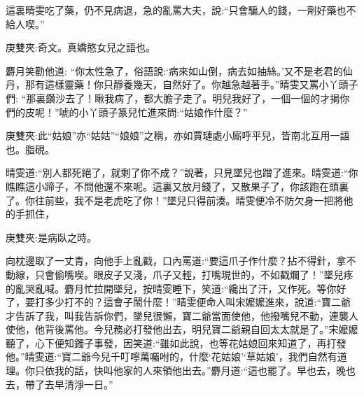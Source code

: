 \begin{parag}
    這裏晴雯吃了藥，仍不見病退，急的亂罵大夫，說:“只會騙人的錢，一劑好藥也不給人喫。”\begin{note}庚雙夾:奇文。真嬌憨女兒之語也。\end{note}麝月笑勸他道: “你太性急了，俗語說:‘病來如山倒，病去如抽絲。’又不是老君的仙丹，那有這樣靈藥！你只靜養幾天，自然好了。你越急越著手。”晴雯又罵小丫頭子們: “那裏鑽沙去了！瞅我病了，都大膽子走了。明兒我好了，一個一個的才揭你們的皮呢！”唬的小丫頭子篆兒忙進來問:“姑娘作什麼？”\begin{note}庚雙夾:此“姑娘”亦“姑姑”“娘娘”之稱，亦如賈璉處小廝呼平兒，皆南北互用一語也。脂硯。\end{note}晴雯道:“別人都死絕了，就剩了你不成？”說著，只見墜兒也蹭了進來。晴雯道:“你瞧瞧這小蹄子，不問他還不來呢。這裏又放月錢了，又散果子了，你該跑在頭裏了。你往前些，我不是老虎吃了你！”墜兒只得前湊。晴雯便冷不防欠身一把將他的手抓住，\begin{note}庚雙夾:是病臥之時。\end{note}向枕邊取了一丈青，向他手上亂戳，口內罵道:“要這爪子作什麼？拈不得針，拿不動線，只會偷嘴喫。眼皮子又淺，爪子又輕，打嘴現世的，不如戳爛了！”墜兒疼的亂哭亂喊。麝月忙拉開墜兒，按晴雯睡下，笑道:“纔出了汗，又作死。等你好了，要打多少打不的？這會子鬧什麼！”晴雯便命人叫宋嬤嬤進來，說道:“寶二爺才告訴了我，叫我告訴你們，墜兒很懶，寶二爺當面使他，他撥嘴兒不動，連襲人使他，他背後罵他。今兒務必打發他出去，明兒寶二爺親自回太太就是了。”宋嬤嬤聽了，心下便知鐲子事發，因笑道:“雖如此說，也等花姑娘回來知道了，再打發他。”晴雯道:“寶二爺今兒千叮嚀萬囑咐的，什麼‘花姑娘’‘草姑娘’，我們自然有道理。你只依我的話，快叫他家的人來領他出去。”麝月道:“這也罷了。早也去，晚也去，帶了去早清淨一日。”
\end{parag}


